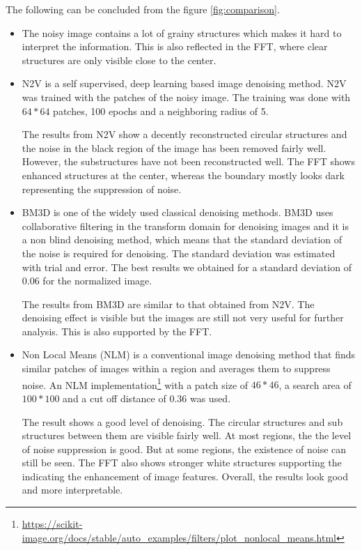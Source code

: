 \documentclass[fleqn,10pt]{wlscirep}
\begin{document}
	The following can be concluded from the figure \ref{fig:comparison}.
	\begin{itemize}
		\item The noisy image contains a lot of grainy structures which makes it hard to interpret the information. This is also reflected in the FFT, where clear structures are only visible close to the center.
		
		\item N2V\cite{krull2019noise2void} is a self supervised, deep learning based image denoising method. N2V was trained with the patches of the noisy image. The training was done with $64*64$ patches, 100 epochs and a neighboring radius of 5. 
		
		The results from N2V show a decently reconstructed circular structures and the noise in the black region of the image has been removed fairly well. However, the substructures have not been reconstructed well. The FFT shows enhanced structures at the center, whereas the boundary mostly looks dark representing the suppression of noise. 
		
		\item BM3D \cite{DBLP:journals/tip/BM3D} is one of the widely used classical denoising methods. BM3D uses collaborative filtering in the transform domain for denoising images and it is a non blind denoising method, which means that the standard deviation of the noise is required for denoising. The standard deviation was estimated with trial and error. The best results we obtained for a standard deviation of 0.06 for the normalized image.
		
		The results from BM3D are similar to that obtained from N2V. The denoising effect is visible but the images are still not very useful for further analysis. This is also supported by the FFT.
		
		\item Non Local Means (NLM) \cite{bcm_nlm} is a conventional image denoising method that finds similar patches of images within a region and averages them to suppress noise. An NLM implementation\footnote{\url{https://scikit-image.org/docs/stable/auto_examples/filters/plot_nonlocal_means.html}} with a patch size of $46*46$, a search area of $100*100$ and a cut off distance of 0.36 was used. 
		
		The result shows a good level of denoising. The circular structures and sub structures between them are visible fairly well. At most regions, the the level of noise suppression is good. But at some regions, the existence of noise can still be seen. The FFT also shows stronger white structures supporting the indicating the enhancement of image features. Overall, the results look good and more interpretable. 
		

\end{itemize}
\end{document}
